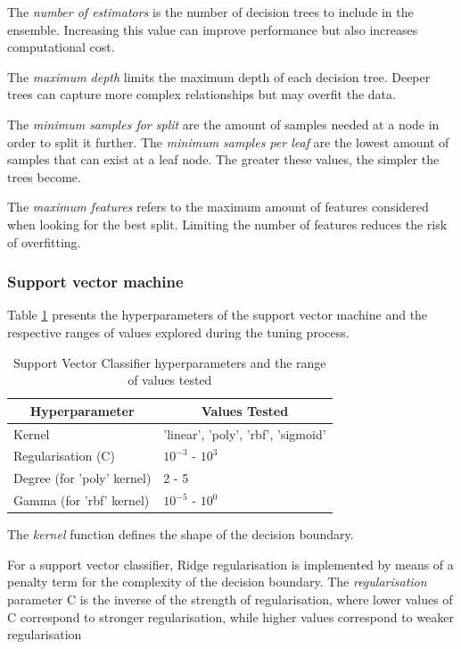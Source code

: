 The \textit{number of estimators} is the number of decision trees to include in the ensemble. Increasing this value can improve performance but also increases computational cost.

The \textit{maximum depth} limits the maximum depth of each decision tree. Deeper trees can capture more complex relationships but may overfit the data. 

The \textit{minimum samples for split} are the amount of samples needed at a node in order to split it further. The \textit{minimum samples per leaf} are the lowest amount of samples that can exist at a leaf node. The greater these values, the simpler the trees become.

The \textit{maximum features} refers to the maximum amount of features considered when looking for the best split. Limiting the number of features reduces the risk of overfitting.

\subsubsection{Support vector machine}

Table \ref{tab:svc_params} presents the hyperparameters of the support vector machine and the respective ranges of values explored during the tuning process.

\begin{table}[h]
	\centering
	\begin{tabular}{ll}
		\toprule
		\multicolumn{1}{c}{\textbf{Hyperparameter}} & \multicolumn{1}{c}{\textbf{Values Tested}} \\
		\midrule
		Kernel                     & 'linear', 'poly', 'rbf', 'sigmoid' \\
		Regularisation (C)         & $10^{-3}$ - $10^{3}$ \\
		Degree (for 'poly' kernel) & 2 - 5 \\
		Gamma (for 'rbf' kernel)   & $10^{-5}$ - $10^{0}$ \\
		\bottomrule
	\end{tabular}
	\caption{Support Vector Classifier hyperparameters and the range of values tested}
	\label{tab:svc_params}
\end{table}

The \textit{kernel} function defines the shape of the decision boundary.

For a support vector classifier, Ridge regularisation is implemented by means of a penalty term for the complexity of the decision boundary. The \textit{regularisation} parameter C is the inverse of the strength of regularisation, where lower values of C correspond to stronger regularisation, while higher values correspond to weaker regularisation

